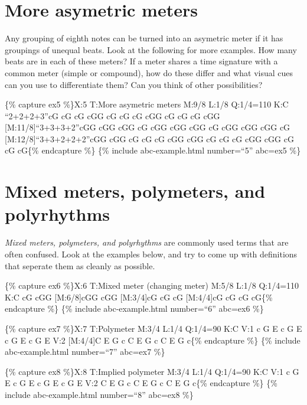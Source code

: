 \documentclass{book}
\begin{document}
\hypertarget{more-asymetric-meters}{%
\section{More asymetric meters}\label{more-asymetric-meters}}

Any grouping of eighth notes can be turned into an asymetric meter if it has
groupings of unequal beats. Look at the following for more examples. How many
beats are in each of these meters? If a meter shares a time signature with a
common meter (simple or compound), how do these differ and what visual cues
can you use to differentiate them? Can you think of other possibilities?

\{\% capture ex5 \%\}X:5 T:More asymetric meters M:9/8 L:1/8 Q:1/4=110 K:C
``2+2+2+3''cG cG cG cGG\textbar{} cG cG cG cGG\textbar{} cG cG cG
cGG\textbar{]} {[}M:11/8{]}``3+3+3+2''cGG cGG cGG cG\textbar{} cGG cGG cGG
cG\textbar{} cGG cGG cGG cG\textbar{]} {[}M:12/8{]}``3+3+2+2+2''cGG cGG cG cG
cG\textbar{} cGG cGG cG cG cG\textbar{} cGG cGG cG cG cG\textbar{]}\{\%
endcapture \%\} \{\% include abc-example.html number=``5'' abc=ex5 \%\}

\hypertarget{mixed-meters-polymeters-and-polyrhythms}{%
\section{Mixed meters, polymeters, and
polyrhythms}\label{mixed-meters-polymeters-and-polyrhythms}}

\emph{Mixed meters, polymeters, and polyrhythms} are commonly used terms that
are often confused. Look at the examples below, and try to come up with
definitions that seperate them as cleanly as possible.

\{\% capture ex6 \%\}X:6 T:Mixed meter (changing meter) M:5/8 L:1/8 Q:1/4=110
K:C cG cGG\textbar{} {[}M:6/8{]}cGG cGG\textbar{} {[}M:3/4{]}cG cG
cG\textbar{} {[}M:4/4{]}cG cG cG cG\textbar{]}\{\% endcapture \%\} \{\%
include abc-example.html number=``6'' abc=ex6 \%\}

\{\% capture ex7 \%\}X:7 T:Polymeter M:3/4 L:1/4 Q:1/4=90 K:C V:1 c G
E\textbar{} c G E\textbar{} c G E\textbar{} c G E\textbar{]} V:2 {[}M:4/4{]}C
E G c\textbar{} C E G c\textbar{} C E G c\textbar{]}\{\% endcapture \%\} \{\%
include abc-example.html number=``7'' abc=ex7 \%\}

\{\% capture ex8 \%\}X:8 T:Implied polymeter M:3/4 L:1/4 Q:1/4=90 K:C V:1 c G
E\textbar{} c G E\textbar{} c G E\textbar{} c G E\textbar{]} V:2 C E
G\textbar{} c C E\textbar{} G c C\textbar{} E G c\textbar{]}\{\% endcapture
\%\} \{\% include abc-example.html number=``8'' abc=ex8 \%\}
\end{document}
